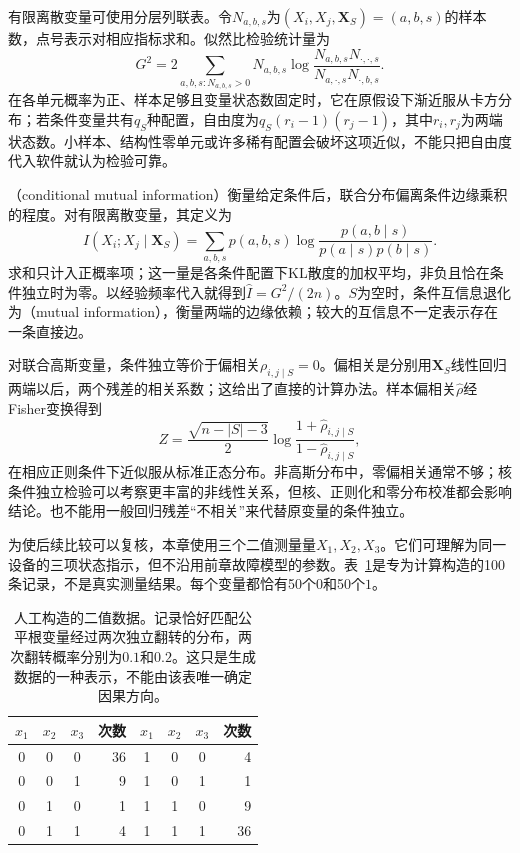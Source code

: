 有限离散变量可使用分层列联表。令$N_{a,b,s}$为$(X_i,X_j,\bm{X}_S)=(a,b,s)$的样本数，点号表示对相应指标求和。似然比检验统计量为
\begin{equation}
  G^2=2\sum_{a,b,s:N_{a,b,s}>0}
  N_{a,b,s}\log
  \frac{N_{a,b,s}N_{\cdot,\cdot,s}}
       {N_{a,\cdot,s}N_{\cdot,b,s}}.
  \label{eq:pgm-structure-learning-g-test}
\end{equation}
在各单元概率为正、样本足够且变量状态数固定时，它在原假设下渐近服从卡方分布；若条件变量共有$q_S$种配置，自由度为$q_S(r_i-1)(r_j-1)$，其中$r_i,r_j$为两端状态数。小样本、结构性零单元或许多稀有配置会破坏这项近似，不能只把自由度代入软件就认为检验可靠。

（conditional mutual information）衡量给定条件后，联合分布偏离条件边缘乘积的程度。对有限离散变量，其定义为
\[
  I(X_i;X_j\mid\bm{X}_S)
  =\sum_{a,b,s}p(a,b,s)
       \log\frac{p(a,b\mid s)}{p(a\mid s)p(b\mid s)}.
\]
求和只计入正概率项；这一量是各条件配置下KL散度的加权平均，非负且恰在条件独立时为零。以经验频率代入就得到$\widehat I=G^2/(2n)$。$S$为空时，条件互信息退化为（mutual information），衡量两端的边缘依赖；较大的互信息不一定表示存在一条直接边。

对联合高斯变量，条件独立等价于偏相关$\rho_{i,j\mid S}=0$。偏相关是分别用$\bm{X}_S$线性回归两端以后，两个残差的相关系数；这给出了直接的计算办法。样本偏相关$\widehat\rho$经Fisher变换得到
\[
  Z=\frac{\sqrt{n-|S|-3}}{2}
    \log\frac{1+\widehat\rho_{i,j\mid S}}
                  {1-\widehat\rho_{i,j\mid S}},
\]
在相应正则条件下近似服从标准正态分布。非高斯分布中，零偏相关通常不够；核条件独立检验可以考察更丰富的非线性关系，但核、正则化和零分布校准都会影响结论。也不能用一般回归残差“不相关”来代替原变量的条件独立。

为使后续比较可以复核，本章使用三个二值测量量$X_1,X_2,X_3$。它们可理解为同一设备的三项状态指示，但不沿用前章故障模型的参数。表~\ref{tab:pgm-structure-learning-counts}是专为计算构造的100条记录，不是真实测量结果。每个变量都恰有50个$0$和50个$1$。

\begin{table}[htbp]
  \centering
  \begin{tabular}{ccc r@{\qquad}ccc r}
    \toprule
    $x_1$ & $x_2$ & $x_3$ & 次数 & $x_1$ & $x_2$ & $x_3$ & 次数 \\
    \midrule
    0 & 0 & 0 & 36 & 1 & 0 & 0 & 4 \\
    0 & 0 & 1 & 9  & 1 & 0 & 1 & 1 \\
    0 & 1 & 0 & 1  & 1 & 1 & 0 & 9 \\
    0 & 1 & 1 & 4  & 1 & 1 & 1 & 36 \\
    \bottomrule
  \end{tabular}
  \caption{人工构造的二值数据。记录恰好匹配公平根变量经过两次独立翻转的分布，两次翻转概率分别为$0.1$和$0.2$。这只是生成数据的一种表示，不能由该表唯一确定因果方向。}
  \label{tab:pgm-structure-learning-counts}
\end{table}

